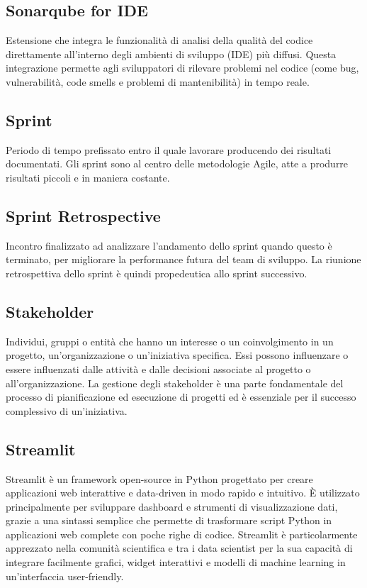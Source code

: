 \subsection*{Sonarqube for IDE}
Estensione che integra le funzionalità di analisi della qualità del codice direttamente all'interno degli ambienti di sviluppo (IDE) più diffusi.
Questa integrazione permette agli sviluppatori di rilevare problemi nel codice (come bug, vulnerabilità, code smells e problemi di mantenibilità) in tempo reale.

\hypertarget{sec:Sprint}{}
\subsection*{Sprint}
Periodo di tempo prefissato entro il quale lavorare producendo dei risultati documentati. Gli sprint sono al centro delle metodologie Agile, atte a produrre 
risultati piccoli e in maniera costante.

\hypertarget{sec:sprint_reptrospective}{}
\subsection*{Sprint Retrospective}
Incontro finalizzato ad analizzare l’andamento dello sprint quando questo è terminato, per migliorare la performance futura del team di sviluppo. La 
riunione retrospettiva dello sprint è quindi propedeutica allo sprint successivo.

\hypertarget{sec:stakeholder}{}
\subsection*{Stakeholder}
Individui, gruppi o entità che hanno un interesse o un coinvolgimento in un progetto, un’organizzazione o un’iniziativa specifica. Essi possono influenzare 
o essere influenzati dalle attività e dalle decisioni associate al progetto o all’organizzazione. La gestione degli stakeholder è una parte fondamentale del 
processo di pianificazione ed esecuzione di progetti ed è essenziale per il successo complessivo di un’iniziativa.

\hypertarget{sec:streamlit}{}
\subsection*{Streamlit}
Streamlit è un framework open-source in Python progettato per creare applicazioni web interattive e data-driven in modo rapido e intuitivo. È utilizzato 
principalmente per sviluppare dashboard e strumenti di visualizzazione dati, grazie a una sintassi semplice che permette di trasformare script Python in 
applicazioni web complete con poche righe di codice. Streamlit è particolarmente apprezzato nella comunità scientifica e tra i data scientist per la sua 
capacità di integrare facilmente grafici, widget interattivi e modelli di machine learning in un'interfaccia user-friendly.

